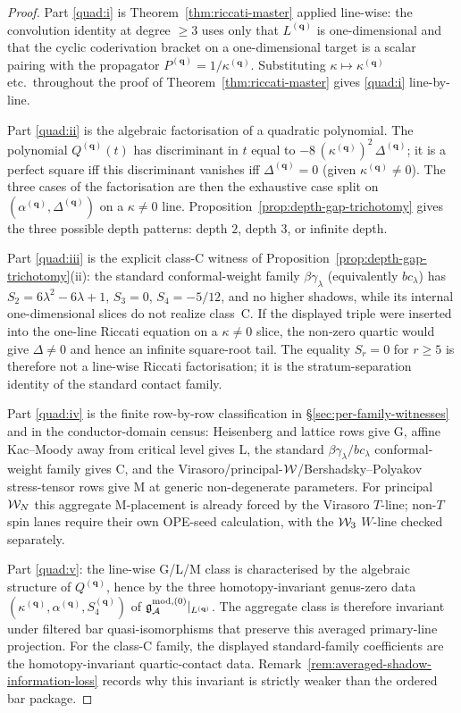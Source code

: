 \begin{proof}
Part \ref{quad:i} is Theorem~\ref{thm:riccati-master} applied
line-wise: the convolution identity at degree $\ge 3$ uses only that
$L^{(\mathbf q)}$ is one-dimensional and that the cyclic coderivation
bracket on a one-dimensional target is a scalar pairing with the
propagator $P^{(\mathbf q)} = 1/\kappa^{(\mathbf q)}$. Substituting
$\kappa \mapsto \kappa^{(\mathbf q)}$ etc.\ throughout the proof of
Theorem~\ref{thm:riccati-master} gives \ref{quad:i} line-by-line.

Part \ref{quad:ii} is the algebraic factorisation of a quadratic
polynomial. The polynomial $Q^{(\mathbf q)}(t)$ has discriminant in
$t$ equal to $-8\,(\kappa^{(\mathbf q)})^{2}\,\Delta^{(\mathbf q)}$;
it is a perfect square iff this discriminant vanishes iff
$\Delta^{(\mathbf q)} = 0$ (given $\kappa^{(\mathbf q)} \neq 0$). The
three cases of the factorisation are then the exhaustive case split
on $(\alpha^{(\mathbf q)}, \Delta^{(\mathbf q)})$ on a
$\kappa \neq 0$ line. Proposition~\ref{prop:depth-gap-trichotomy}
gives the three possible depth patterns: depth $2$, depth $3$, or
infinite depth.

Part \ref{quad:iii} is the explicit class-C witness of
Proposition~\ref{prop:depth-gap-trichotomy}(ii): the standard
conformal-weight family $\beta\gamma_\lambda$
\textup{(}equivalently $bc_\lambda$\textup{)} has
$S_2 = 6\lambda^2 - 6\lambda + 1$, $S_3 = 0$, $S_4 = -5/12$, and
no higher shadows, while its internal one-dimensional slices do not
realize class~C. If the displayed triple were inserted into the
one-line Riccati equation on a $\kappa\ne0$ slice, the non-zero
quartic would give $\Delta\ne0$ and hence an infinite square-root
tail. The equality $S_r=0$ for $r\ge5$ is therefore not a
line-wise Riccati factorisation; it is the stratum-separation
identity of the standard contact family.

Part \ref{quad:iv} is the finite row-by-row classification in
\S\ref{sec:per-family-witnesses} and in the conductor-domain census:
Heisenberg and lattice rows give G, affine Kac--Moody away from
critical level gives L, the
standard $\beta\gamma_\lambda/bc_\lambda$ conformal-weight family gives
C, and the Virasoro/principal-$\mathcal{W}$/Bershadsky--Polyakov stress-tensor
rows give M at generic non-degenerate parameters. For principal
$\mathcal{W}_N$ this aggregate M-placement is already forced by the
Virasoro $T$-line; non-$T$ spin lanes require their own OPE-seed
calculation, with the $\mathcal{W}_3$ $W$-line checked separately.

Part \ref{quad:v}: the line-wise G/L/M class is characterised by the
algebraic structure of $Q^{(\mathbf q)}$, hence by the three
homotopy-invariant genus-zero data
$(\kappa^{(\mathbf q)},\alpha^{(\mathbf q)},S_4^{(\mathbf q)})$ of
$\mathfrak g^{\rm mod,(0)}_{\mathcal{A}}|_{L^{(\mathbf q)}}$. The aggregate
class is therefore invariant under filtered bar quasi-isomorphisms
that preserve this averaged primary-line projection. For the class-C
family, the displayed standard-family coefficients are the
homotopy-invariant quartic-contact data. Remark~\ref{rem:averaged-shadow-information-loss}
records why this invariant is strictly weaker than the ordered bar
package.
\end{proof}


